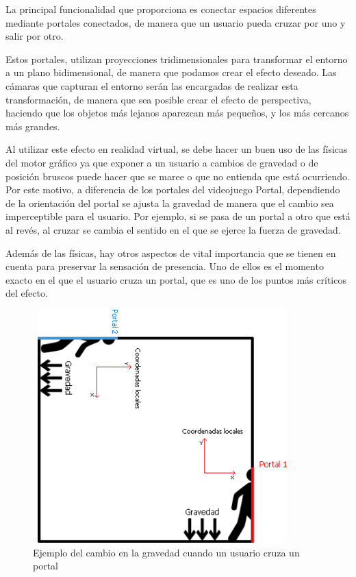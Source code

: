 \documentclass[../main.tex]{subfiles}
\begin{document}
La principal funcionalidad que proporciona es conectar espacios diferentes mediante portales conectados, de manera que un usuario pueda cruzar por uno y salir por otro.

Estos portales, utilizan proyecciones tridimensionales para transformar el entorno a un plano bidimensional, de manera que podamos crear el efecto deseado. Las cámaras que capturan el entorno serán las encargadas de realizar esta transformación, de manera que sea posible crear el efecto de perspectiva, haciendo que los objetos más lejanos aparezcan más pequeños, y los más cercanos más grandes.

Al utilizar este efecto en realidad virtual, se debe hacer un buen uso de las físicas del motor gráfico ya que exponer a un usuario a cambios de gravedad o de posición bruscos puede hacer que se maree o que no entienda que está ocurriendo. Por este motivo, a diferencia de los portales del videojuego Portal, dependiendo de la orientación del portal se ajusta la gravedad de manera que el cambio sea imperceptible para el usuario. Por ejemplo, si se pasa de un portal a otro que está al revés, al cruzar se cambia el sentido en el que se ejerce la fuerza de gravedad.

Además de las físicas, hay otros aspectos de vital importancia que se tienen en cuenta para preservar la sensación de presencia. Uno de ellos es el momento exacto en el que el usuario cruza un portal, que es uno de los puntos más críticos del efecto.

\begin{figure}[h!]
\centering
\includegraphics[width=10cm, height=9cm]{imagenes/portales.png}
\caption{Ejemplo del cambio en la gravedad cuando un usuario cruza un portal}
\label{fig:Portal_Photoshop}
\end{figure}
\end{document}
